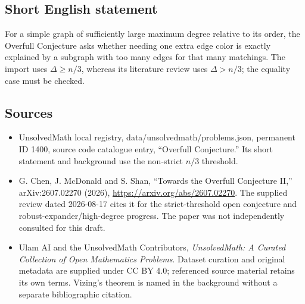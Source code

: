 \documentclass[11pt]{article}
\begin{document}
\subsection{Short English statement}
For a simple graph of sufficiently large maximum degree relative to its order, the Overfull Conjecture asks whether needing one extra edge color is exactly explained by a subgraph with too many edges for that many matchings. The import uses $\Delta\geq n/3$, whereas its literature review uses $\Delta>n/3$; the equality case must be checked.
\subsection{Sources}
\begin{itemize}
\item UnsolvedMath local registry, data/unsolvedmath/problems.json, permanent ID 1400, source code catalogue entry, ``Overfull Conjecture.'' Its short statement and background use the non-strict $n/3$ threshold.
\item G. Chen, J. McDonald and S. Shan, ``Towards the Overfull Conjecture II,'' arXiv:2607.02270 (2026), \url{https://arxiv.org/abs/2607.02270}. The supplied review dated 2026-08-17 cites it for the strict-threshold open conjecture and robust-expander/high-degree progress. The paper was not independently consulted for this draft.
\item Ulam AI and the UnsolvedMath Contributors, \emph{UnsolvedMath: A Curated Collection of Open Mathematics Problems}. Dataset curation and original metadata are supplied under CC BY 4.0; referenced source material retains its own terms. Vizing's theorem is named in the background without a separate bibliographic citation.
\end{itemize}
\end{document}
